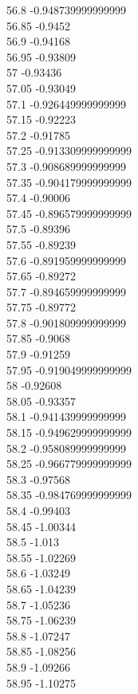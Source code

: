 {56.8	-0.948739999999999\\
56.85	-0.9452\\
56.9	-0.94168\\
56.95	-0.93809\\
57	-0.93436\\
57.05	-0.93049\\
57.1	-0.926449999999999\\
57.15	-0.92223\\
57.2	-0.91785\\
57.25	-0.913309999999999\\
57.3	-0.908689999999999\\
57.35	-0.904179999999999\\
57.4	-0.90006\\
57.45	-0.896579999999999\\
57.5	-0.89396\\
57.55	-0.89239\\
57.6	-0.891959999999999\\
57.65	-0.89272\\
57.7	-0.894659999999999\\
57.75	-0.89772\\
57.8	-0.901809999999999\\
57.85	-0.9068\\
57.9	-0.91259\\
57.95	-0.919049999999999\\
58	-0.92608\\
58.05	-0.93357\\
58.1	-0.941439999999999\\
58.15	-0.949629999999999\\
58.2	-0.958089999999999\\
58.25	-0.966779999999999\\
58.3	-0.97568\\
58.35	-0.984769999999999\\
58.4	-0.99403\\
58.45	-1.00344\\
58.5	-1.013\\
58.55	-1.02269\\
58.6	-1.03249\\
58.65	-1.04239\\
58.7	-1.05236\\
58.75	-1.06239\\
58.8	-1.07247\\
58.85	-1.08256\\
58.9	-1.09266\\
58.95	-1.10275\\
}
